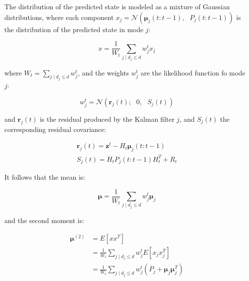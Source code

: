 \noindent The distribution of the predicted state is modeled as a mixture of Gaussian distributions, where each component $x_{j}=\mathcal{N}(\boldsymbol\mu_{j}(t:t-1), \text{ }P_{j}(t:t-1))$ is the distribution of the predicted state in mode $j$:

\begin{equation}
x = \frac{1}{W_{t}}\sum_{j\mid d_{j}\leq d}{w_{j}^{t}x_{j}}
\label{eq:mixture2}
\end{equation}

\noindent where $W_{t}=\sum_{j\mid d_{j}\leq d}{w_{j}^{t}}$, and the weights $w_{j}^{t}$ are the likelihood function fo mode $j$:

\begin{equation}
w_{j}^{t} = \mathcal{N}(\boldsymbol r_{j}(t); \text{ }0, \text{ }S_{j}(t))
\label{eq:weightsMixture}
\end{equation}

\noindent and $\boldsymbol r_{j}(t)$ is the residual produced by the Kalman filter $j$, and $S_{j}(t)$ the corresponding residual covariance:

\begin{equation}
\begin{array}{l}
\boldsymbol r_{j}(t) = \boldsymbol z^{t} - H_{t}\boldsymbol\mu_{j}(t:t-1)\\
S_{j}(t) = H_{t}P_{j}(t:t-1)H_{t}^{T}+R_{t}
\end{array}
\label{eq:weightsMixture2}
\end{equation}

\noindent It follows that the mean is:

\begin{equation}
\boldsymbol \mu = \frac{1}{W_{t}}\sum_{j\mid d_{j}\leq d}{w_{j}^{t}\boldsymbol\mu_{j}}
\label{eq:mixture3}
\end{equation}

\noindent and the second moment is:

\begin{equation}
\begin{array}{ll}
\boldsymbol \mu^{(2)} & = E\left[xx^{T}\right]\\
 & = \frac{1}{W_{t}}\sum_{j\mid d_{j}\leq d}{w_{j}^{t}E\left[x_{j}x^{T}_{j}\right]}\\
 & = \frac{1}{W_{t}}\sum_{j\mid d_{j}\leq d}{w_{j}^{t}\left(P_{j} + \boldsymbol\mu_{j} \boldsymbol\mu^{T}_{j}\right)}
\end{array}
\label{eq:mixture4}
\end{equation}

